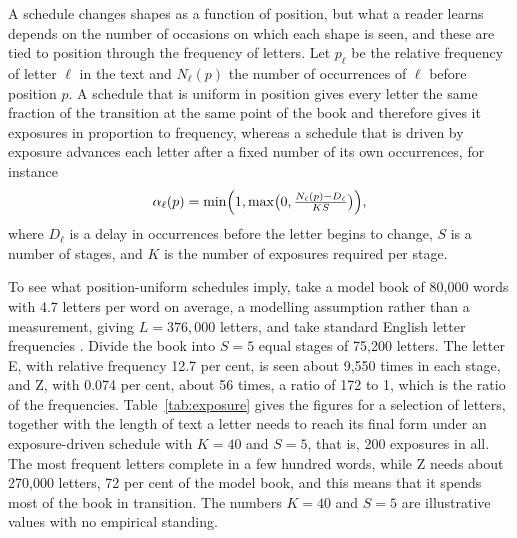 A schedule changes shapes as a function of position, but what a reader learns depends on the number of occasions on which each shape is seen, and these are tied to position through the frequency of letters. Let $p_\ell$ be the relative frequency of letter $\ell$ in the text and $N_\ell(p)$ the number of occurrences of $\ell$ before position $p$. A schedule that is uniform in position gives every letter the same fraction of the transition at the same point of the book and therefore gives it exposures in proportion to frequency, whereas a schedule that is driven by exposure advances each letter after a fixed number of its own occurrences, for instance
\[
\alpha_\ell(p)=\min\Bigl(1,\max\bigl(0,\tfrac{N_\ell(p)-D_\ell}{KS}\bigr)\Bigr),
\]
where $D_\ell$ is a delay in occurrences before the letter begins to change, $S$ is a number of stages, and $K$ is the number of exposures required per stage.

To see what position-uniform schedules imply, take a model book of 80{,}000 words with 4.7 letters per word on average, a modelling assumption rather than a measurement, giving $L=376{,}000$ letters, and take standard English letter frequencies \citep{lewand2000}. Divide the book into $S=5$ equal stages of 75{,}200 letters. The letter E, with relative frequency 12.7 per cent, is seen about 9{,}550 times in each stage, and Z, with 0.074 per cent, about 56 times, a ratio of 172 to 1, which is the ratio of the frequencies. Table~\ref{tab:exposure} gives the figures for a selection of letters, together with the length of text a letter needs to reach its final form under an exposure-driven schedule with $K=40$ and $S=5$, that is, 200 exposures in all. The most frequent letters complete in a few hundred words, while Z needs about 270{,}000 letters, 72 per cent of the model book, and this means that it spends most of the book in transition. The numbers $K=40$ and $S=5$ are illustrative values with no empirical standing.

\begin{table}[ht]
\centering
\small

\caption{Exposure in a model book of $L=376{,}000$ letters. Frequencies are standard English letter frequencies; the final column converts letters to words at 4.7 letters per word. Exposure-driven completion assumes $K=40$ exposures per stage over $S=5$ stages.}\label{tab:exposure}
\end{table}

